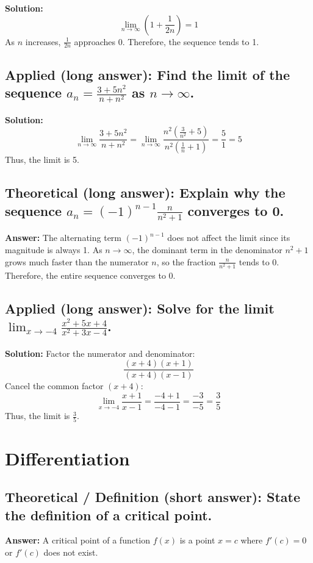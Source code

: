 \documentclass[12pt]{article}
\begin{document}
\textbf{Solution:}
\[
\lim_{n \to \infty} \left( 1 + \frac{1}{2n} \right) = 1
\]
As \( n \) increases, \( \frac{1}{2n} \) approaches 0. Therefore, the sequence tends to 1.

\subsection{Applied (long answer): Find the limit of the sequence \( a_n = \frac{3 + 5n^2}{n + n^2} \) as \( n \to \infty \).}

\textbf{Solution:}
\[
\lim_{n \to \infty} \frac{3 + 5n^2}{n + n^2} = \lim_{n \to \infty} \frac{n^2 \left( \frac{3}{n^2} + 5 \right)}{n^2 \left( \frac{1}{n} + 1 \right)} = \frac{5}{1} = 5
\]
Thus, the limit is 5.

\subsection{Theoretical (long answer): Explain why the sequence \( a_n = (-1)^{n-1} \frac{n}{n^2+1} \) converges to 0.}

\textbf{Answer:} The alternating term \( (-1)^{n-1} \) does not affect the limit since its magnitude is always 1. As \( n \to \infty \), the dominant term in the denominator \( n^2 + 1 \) grows much faster than the numerator \( n \), so the fraction \( \frac{n}{n^2 + 1} \) tends to 0. Therefore, the entire sequence converges to 0.

\subsection{Applied (long answer): Solve for the limit \( \lim_{x \to -4} \frac{x^2 + 5x + 4}{x^2 + 3x - 4} \).}

\textbf{Solution:}
Factor the numerator and denominator:
\[
\frac{(x+4)(x+1)}{(x+4)(x-1)}
\]
Cancel the common factor \( (x+4) \):
\[
\lim_{x \to -4} \frac{x+1}{x-1} = \frac{-4+1}{-4-1} = \frac{-3}{-5} = \frac{3}{5}
\]
Thus, the limit is \( \frac{3}{5} \).


\section{Differentiation}

\subsection{Theoretical / Definition (short answer): State the definition of a critical point.}
\textbf{Answer:} A critical point of a function \( f(x) \) is a point \( x = c \) where \( f'(c) = 0 \) or \( f'(c) \) does not exist.
\end{document}
